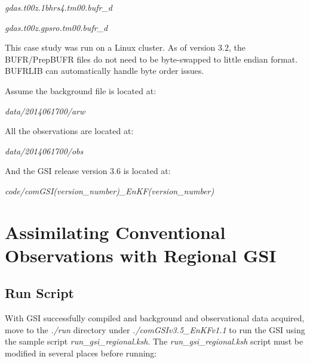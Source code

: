 \begin{enumerate}
\begin{itemize}
     \qquad\quad  \textit{gdas.t00z.1bhrs4.tm00.bufr\_d}

     \qquad\quad  \textit{gdas.t00z.gpsro.tm00.bufr\_d}
\end{itemize}
\end{enumerate}

This case study was run on a Linux cluster. As of  version 3.2, the BUFR/PrepBUFR files do not need to be byte-swapped to little endian format. BUFRLIB can automatically handle byte order issues.

Assume the background file is located at:

\textit{data/2014061700/arw}

All the observations are located at:

\textit{data/2014061700/obs}

And the GSI release version 3.6 is located at:

\textit{code/comGSI(version\_number)\_EnKF(version\_number)}

\section{Assimilating Conventional Observations with Regional GSI}

\subsection{Run Script}
\label{sec5.1.1}

With GSI successfully compiled and background and observational data acquired, move to the \textit{./run} directory under \textit{./comGSIv3.5\_EnKFv1.1} to run the GSI using the sample script \textit{run\_gsi\_regional.ksh}.  The \textit{run\_gsi\_regional.ksh} script must be modified in several places before running:

